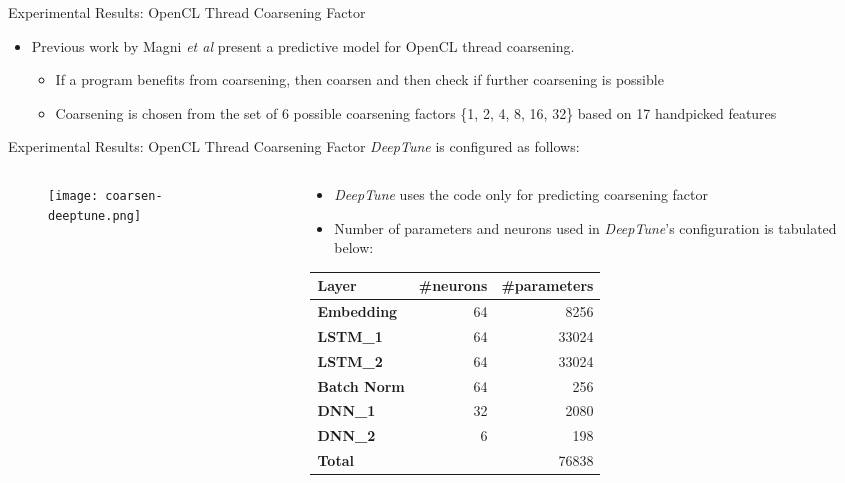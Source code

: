 \documentclass[10pt]{beamer}
\begin{document}
\begin{frame}{Experimental Results: OpenCL Thread Coarsening Factor}
\begin{itemize}
\item<1->{Previous work by Magni \textit{et al} present a predictive model for OpenCL thread coarsening.
          \begin{itemize}
          \item<2->{If a program benefits from coarsening, then coarsen and then check if further coarsening is possible}
          \item<3->{Coarsening is chosen from the set of 6 possible coarsening factors \{1, 2, 4, 8, 16, 32\} based on 17 handpicked features}
          \end{itemize}}
\end{itemize}
\end{frame}

\begin{frame}{Experimental Results: OpenCL Thread Coarsening Factor}
\emph{DeepTune} is configured as follows:
\begin{columns}
\begin{column}{0.5\textwidth}
\begin{figure}[H]
\centering
\texttt{[image: coarsen-deeptune.png]}
\end{figure}
\end{column}
\hfill
\begin{column}{0.5\textwidth}
\begin{itemize}
\item{\emph{DeepTune} uses the code only for predicting coarsening factor}
\item{Number of parameters and neurons used in \emph{DeepTune}'s configuration is tabulated below:}
\end{itemize}
\begin{tabular}{|l|r|r|}
\hline
\small \textbf{Layer} & \small\#neurons & \small\#parameters \\
\hline
\small \textbf{Embedding} & \small 64 & \small 8256 \\
\small \textbf{LSTM\_1} & \small 64 & \small 33024 \\
\small \textbf{LSTM\_2} & \small 64 & \small 33024 \\
\small \textbf{Batch Norm} & \small 64 & \small 256 \\
\small \textbf{DNN\_1} & \small 32 & \small 2080 \\
\small \textbf{DNN\_2} & \small 6 & \small 198 \\
\hline
\small \textbf{Total} & & \small 76838 \\
\hline
\end{tabular}
\end{column}
\end{columns}
\end{frame}
\end{document}
